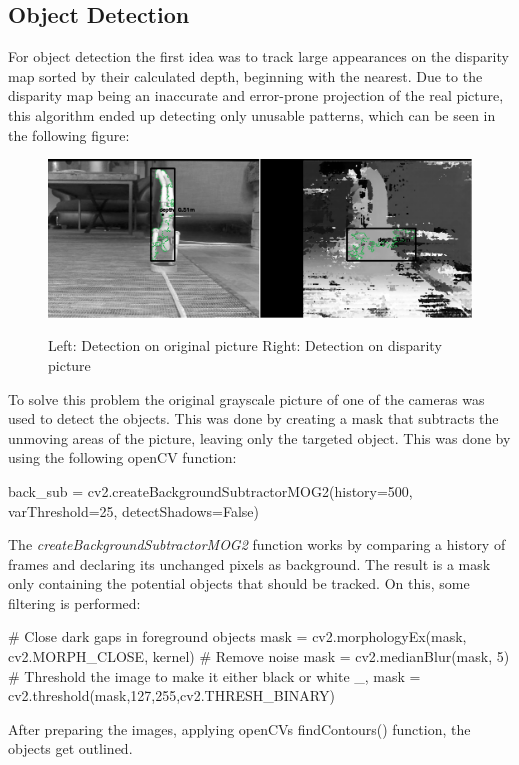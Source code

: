 \documentclass[journal,onecolumn]{IEEEtran}
\begin{document}
\subsection{Object Detection}
\noindent For object detection the first idea was to track large appearances on the disparity map sorted by their calculated depth, beginning with the nearest. Due to the disparity map being an inaccurate and error-prone projection of the real picture, this algorithm ended up detecting only unusable patterns, which can be seen in the following figure:
\begin{figure}[H]
	\centering
	\includegraphics[scale=0.5]{handstand_comparison.png}
	\label{tracking}
	\captionsetup{justification=centering}
	\caption{Left: Detection on original picture Right: Detection on disparity picture }
\end{figure}
\noindent To solve this problem the original grayscale picture of one of the cameras was used to detect the objects. This was done by creating a mask that subtracts the unmoving areas of the picture, leaving only the targeted object. This was done by using the following openCV function:
\begin{python}
back_sub = cv2.createBackgroundSubtractorMOG2(history=500, varThreshold=25, detectShadows=False)
\end{python}
\noindent The \emph{createBackgroundSubtractorMOG2} function works by comparing a history of frames and declaring its unchanged pixels as background. The result is a mask only containing the potential objects that should be tracked. On this, some filtering is performed:
\begin{python}
# Close dark gaps in foreground objects
mask = cv2.morphologyEx(mask, cv2.MORPH_CLOSE, kernel)
# Remove noise
mask = cv2.medianBlur(mask, 5)
# Threshold the image to make it either black or white
_, mask = cv2.threshold(mask,127,255,cv2.THRESH_BINARY)
\end{python}
\noindent After preparing the images, applying openCVs findContours() function, the objects get outlined.
\end{document}
